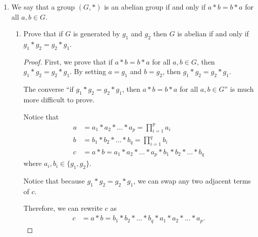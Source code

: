 \documentclass{article}
\begin{document}
\begin{enumerate}
{\begin{enumerate}
{\begin{enumerate}
{\begin{proof}
                    \emph{I made this statement more detailed.}
                    Thus, for \(k\), we have \(n\) possible choices, and for \(\ell\),
                    we have 2 possible choices. Therefore, there are \(n * 2 = 2n\) 
                    total choices possible. Thus, \(|D_n| = 2n\).
                \end{proof}
            }

        \end{enumerate}
    }

    \item {
        We say that a group \((G,*)\) is an abelian group if and only if 
        \(a * b = b * a\) for all \(a, b \in G\).
      
        \begin{enumerate}
            \item {
                Prove that if \(G\) is generated by \(g_1\) and \(g_2\) then 
                \(G\) is abelian if and only if \(g_1 * g_2 = g_2 * g_1\).


                \begin{proof}
                    First, we prove that if \(a * b = b * a\) for all \(a, b \in G\),
                    then \(g_1 * g_2 = g_2 * g_1\). By setting \(a = g_1\) and 
                    \(b = g_2\),  then \(g_1 * g_2 = g_2 * g_1\).

                    The converse ``if \(g_1 * g_2 = g_2 * g_1\), then \(a * b = b * a\) for all \(a, b \in G\)''
                    is much more difficult to prove. 

                    Notice that 
                    \begin{align}
                        a &= a_1 * a_2 * \dots * a_p = \prod_{i=1}^p a_i \\
                        b &= b_1 * b_2 * \dots * b_q = \prod_{i=1}^q b_i \\
                        c &= a * b = a_1 * a_2 * \dots * a_p * b_1 * b_2 * \dots * b_q
                    \end{align}
                    where \(a_i, b_i \in \{g_1, g_2\}\).

                    Notice that because \(g_1 * g_2 = g_2 * g_1\), we can swap 
                    any two adjacent terms of \(c\).

                    Therefore, we can rewrite \(c\) as 
                    \begin{align}
                        c &= a * b = b_1 * b_2 * \dots * b_q * a_1 * a_2 * \dots * a_p.
                    \end{align}


\end{proof}}
\end{enumerate}}
\end{enumerate}}
\end{enumerate}
\end{document}

